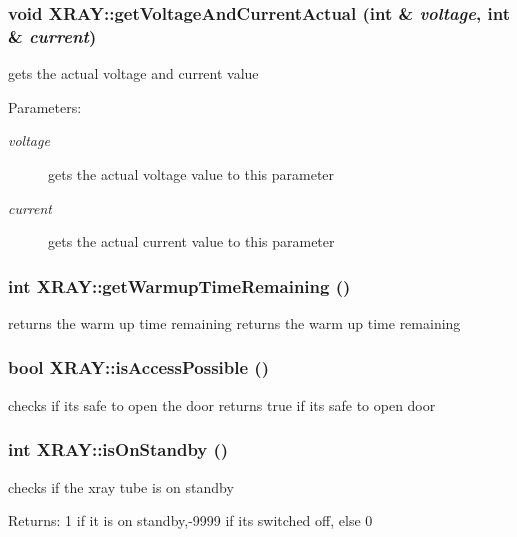 \subsubsection{\setlength{\rightskip}{0pt plus 5cm}void XRAY::get\-Voltage\-And\-Current\-Actual (int \& {\em voltage}, int \& {\em current})}\label{classXRAY_aeb91da9da8b141cd2c8919dc1f0e39d}


gets the actual voltage and current value \begin{Desc}
\item[Parameters:]
\begin{description}
\item[{\em voltage}]gets the actual voltage value to this parameter \item[{\em current}]gets the actual current value to this parameter \end{description}
\end{Desc}
\subsubsection{\setlength{\rightskip}{0pt plus 5cm}int XRAY::get\-Warmup\-Time\-Remaining ()}\label{classXRAY_a2c1db8eec2254828a3c499466337708}


returns the warm up time remaining returns the warm up time remaining 
\subsubsection{\setlength{\rightskip}{0pt plus 5cm}bool XRAY::is\-Access\-Possible ()}\label{classXRAY_cf64fa993471ffe3c7282156bd980960}


checks if its safe to open the door returns true if its safe to open door 
\subsubsection{\setlength{\rightskip}{0pt plus 5cm}int XRAY::is\-On\-Standby ()}\label{classXRAY_4617b711c897762f7e7c8d20b6885647}


checks if the xray tube is on standby \begin{Desc}
\item[Returns:]1 if it is on standby,-9999 if its switched off, else 0 \end{Desc}
